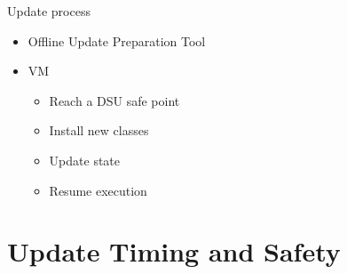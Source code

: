 


\begin{frame}[t,fragile]{Update process}%
\begin{itemize}
\item Offline Update Preparation Tool
\item \DSU{} VM
  \begin{itemize}
  \item Reach a DSU safe point
  \item Install new classes
  \item Update state
  \item Resume execution
  \end{itemize}
\end{itemize}
\end{frame}

\section{Update Timing and Safety}


